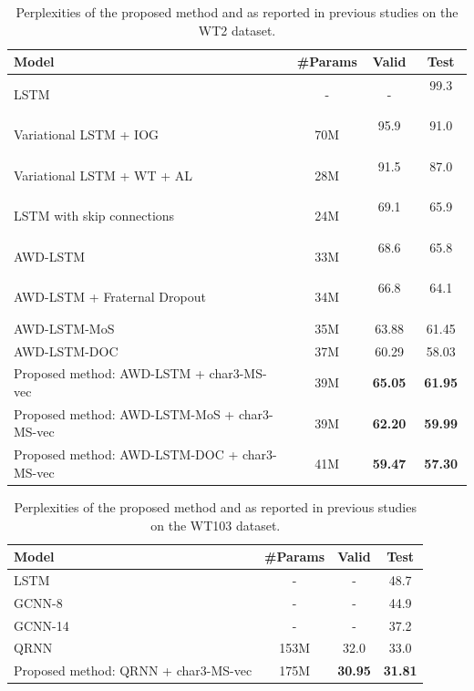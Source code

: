 \documentclass[letterpaper]{article} %
\begin{document}
\begin{table}[!t]
  \centering
  \begin{tabular}{ l | c | c c }
  \toprule
  Model & \#Params & Valid & Test \\
  \midrule
  LSTM \cite{DBLP:journals/corr/GraveJU16} & - & - & 99.3 \ \  \\
  Variational LSTM + IOG \cite{takase-suzuki-nagata:2017:I17-2} & 70M & 95.9 \ \  & 91.0 \ \  \\
  Variational LSTM + WT + AL \cite{DBLP:journals/corr/InanKS16} & 28M & 91.5 \ \  & 87.0 \ \  \\
  LSTM with skip connections \cite{DBLP:journals/corr/MelisDB17} & 24M & 69.1 \ \  & 65.9 \ \  \\
  AWD-LSTM \cite{merityRegOpt} & 33M & 68.6 \ \  & 65.8 \ \  \\
  AWD-LSTM + Fraternal Dropout \cite{fraternal} & 34M & 66.8 \ \  & 64.1 \ \  \\
  AWD-LSTM-MoS \cite{DBLP:journals/corr/abs-1711-03953} & 35M & 63.88 & 61.45 \\
  AWD-LSTM-DOC \cite{D18-1489} & 37M & 60.29 & 58.03 \\
  \midrule
  Proposed method: AWD-LSTM + char3-MS-vec & 39M & {\bf 65.05} & {\bf 61.95} \\
  Proposed method: AWD-LSTM-MoS + char3-MS-vec & 39M & {\bf 62.20} & {\bf 59.99} \\
  Proposed method: AWD-LSTM-DOC + char3-MS-vec & 41M & {\bf 59.47} & {\bf 57.30} \\
  \bottomrule
  \end{tabular}
  \caption{Perplexities of the proposed method and as reported in previous studies on the WT2 dataset.\label{tb:perplexityOnWikitext2}}
\end{table}


\begin{table}[!t]
  \centering
  \begin{tabular}{ l | c | c c }
  \toprule
  Model & \#Params & Valid & Test \\ 
  \midrule
  LSTM \cite{DBLP:journals/corr/GraveJU16} & - & - & 48.7 \\
  GCNN-8 \cite{DBLP:journals/corr/DauphinFAG16} & - & - & 44.9 \\
  GCNN-14 \cite{DBLP:journals/corr/DauphinFAG16} & - & - & 37.2 \\
  QRNN \cite{merityAnalysis} & 153M & 32.0 & 33.0 \\
  \midrule
  Proposed method: QRNN + char3-MS-vec & 175M & {\bf 30.95} & {\bf 31.81} \\
  \bottomrule
  \end{tabular}
  \caption{Perplexities of the proposed method and as reported in previous studies on the WT103 dataset.\label{tb:perplexityOnWikitext103}}
\end{table}
\end{document}
